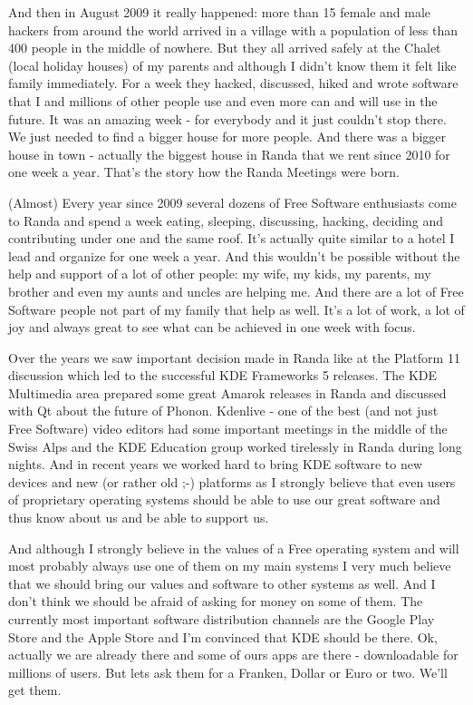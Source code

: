 And then in August 2009 it really happened: more than 15 female and male hackers from around the world arrived in a village with a population of less than 400 people in the middle of nowhere. But they all arrived safely at the Chalet (local holiday houses) of my parents and although I didn't know them it felt like family immediately. For a week they hacked, discussed, hiked and wrote software that I and millions of other people use and even more can and will use in the future. It was an amazing week - for everybody and it just couldn't stop there. We just needed to find a bigger house for more people. And there was a bigger house in town - actually the biggest house in Randa that we rent since 2010 for one week a year. That's the story how the Randa Meetings were born.

(Almost) Every year since 2009 several dozens of Free Software enthusiasts come to Randa and spend a week eating, sleeping, discussing, hacking, deciding and contributing under one and the same roof. It's actually quite similar to a hotel I lead and organize for one week a year. And this wouldn't be possible without the help and support of a lot of other people: my wife, my kids, my parents, my brother and even my aunts and uncles are helping me. And there are a lot of Free Software people not part of my family that help as well. It's a lot of work, a lot of joy and always great to see what can be achieved in one week with focus.

Over the years we saw important decision made in Randa like at the Platform 11 discussion which led to the successful KDE Frameworks 5 releases. The KDE Multimedia area prepared some great Amarok releases in Randa and discussed with Qt about the future of Phonon. Kdenlive - one of the best (and not just Free Software) video editors had some important meetings in the middle of the Swiss Alps and the KDE Education group worked tirelessly in Randa during long nights. And in recent years we worked hard to bring KDE software to new devices and new (or rather old ;-) platforms as I strongly believe that even users of proprietary operating systems should be able to use our great software and thus know about us and be able to support us.

And although I strongly believe in the values of a Free operating system and will most probably always use one of them on my main systems I very much believe that we should bring our values and software to other systems as well. And I don't think we should be afraid of asking for money on some of them. The currently most important software distribution channels are the Google Play Store and the Apple Store and I'm convinced that KDE should be there. Ok, actually we are already there and some of ours apps are there - downloadable for millions of users. But lets ask them for a Franken, Dollar or Euro or two. We'll get them.

